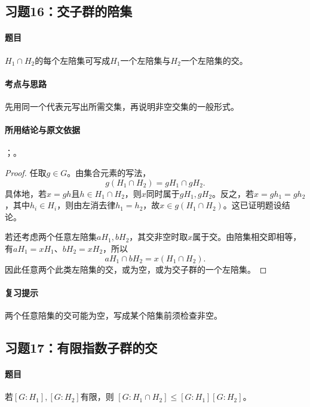 \subsection{习题16：\texorpdfstring{交子群的陪集}{交子群的陪集}}
\label{ex:2:16}

\paragraph{题目}
$H_1\cap H_2$的每个左陪集可写成$H_1$一个左陪集与$H_2$一个左陪集的交。

\paragraph{考点与思路}
先用同一个代表元写出所需交集，再说明非空交集的一般形式。

\paragraph{所用结论与原文依据}
；。


\begin{proof}
任取$g\in G$。由集合元素的写法，
\[
g(H_1\cap H_2)=gH_1\cap gH_2.
\]
具体地，若$x=gh$且$h\in H_1\cap H_2$，则$x$同时属于$gH_1,gH_2$。反之，若$x=gh_1=gh_2$，其中$h_i\in H_i$，则由左消去律$h_1=h_2$，故$x\in g(H_1\cap H_2)$。这已证明题设结论。

若还考虑两个任意左陪集$aH_1,bH_2$，其交非空时取$x$属于交。由陪集相交即相等，有$aH_1=xH_1$、$bH_2=xH_2$，所以
\[
aH_1\cap bH_2=x(H_1\cap H_2).
\]
因此任意两个此类左陪集的交，或为空，或为交子群的一个左陪集。
\end{proof}

\paragraph{复习提示}
两个任意陪集的交可能为空，写成某个陪集前须检查非空。


\subsection{习题17：\texorpdfstring{有限指数子群的交}{有限指数子群的交}}
\label{ex:2:17}

\paragraph{题目}
若$[G:H_1],[G:H_2]$有限，则
$[G:H_1\cap H_2]\leq[G:H_1][G:H_2]$。

